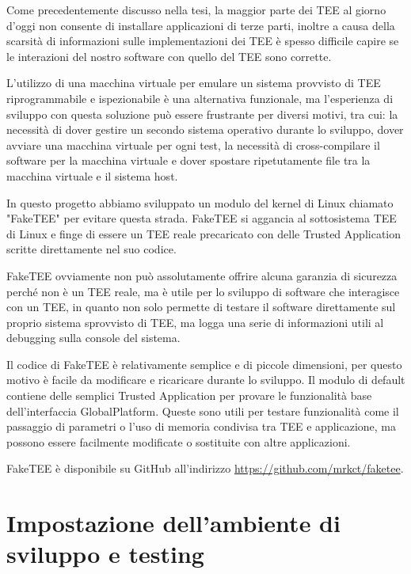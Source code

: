 \documentclass[12pt,italian]{report}
\begin{document}
Come precedentemente discusso nella tesi, la maggior parte dei TEE al giorno
d'oggi non consente di installare applicazioni di terze parti, inoltre
a causa della scarsità di informazioni sulle implementazioni dei TEE
è spesso difficile capire se le interazioni del nostro software con quello
del TEE sono corrette.

L'utilizzo di una macchina virtuale per emulare un sistema provvisto di TEE
riprogrammabile e ispezionabile è una alternativa funzionale, ma
l'esperienza di sviluppo con questa soluzione può essere frustrante per
diversi motivi, tra cui: la necessità di dover gestire un secondo sistema
operativo durante lo sviluppo, dover avviare una macchina virtuale per ogni
test, la necessità di cross-compilare il software per la macchina virtuale
e dover spostare ripetutamente file tra la macchina virtuale e il sistema
host.

In questo progetto abbiamo sviluppato un modulo del kernel di Linux chiamato
"FakeTEE" per evitare questa strada. FakeTEE si aggancia al sottosistema TEE
di Linux e finge di essere un TEE reale precaricato con delle
Trusted Application scritte direttamente nel suo codice.

FakeTEE ovviamente non può assolutamente offrire alcuna garanzia di sicurezza
perché non è un TEE reale, ma è utile per lo sviluppo di software che
interagisce con un TEE, in quanto non solo permette di testare il software
direttamente sul proprio sistema sprovvisto di TEE, ma logga una serie di
informazioni utili al debugging sulla console del sistema.

Il codice di FakeTEE è relativamente semplice e di piccole dimensioni, per
questo motivo è facile da modificare e ricaricare durante lo sviluppo.
Il modulo di default contiene delle semplici Trusted Application per provare
le funzionalità base dell'interfaccia GlobalPlatform.
Queste sono utili per testare funzionalità come il passaggio di parametri o
l'uso di memoria condivisa tra TEE e applicazione, ma possono essere
facilmente modificate o sostituite con altre applicazioni.

FakeTEE è disponibile su GitHub all'indirizzo
\url{https://github.com/mrkct/faketee}.

\chapter{Impostazione dell'ambiente di sviluppo e testing}
\label{app:impostazione-ambiente-sviluppo-testing}



\end{document}
